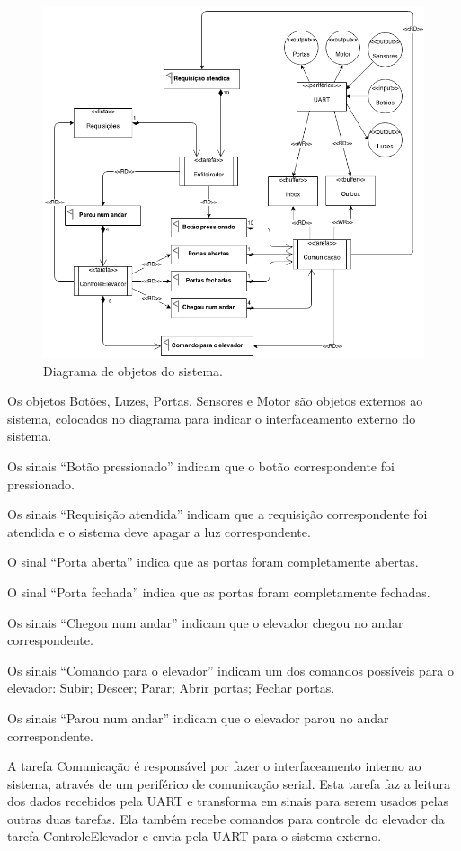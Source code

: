 \begin{figure}[h]
    \centering
    \includegraphics[width=0.8\columnwidth]{./figures/Objetos.png}
    \caption{Diagrama de objetos do sistema.}
    \label{fig:objetos}
\end{figure}

Os objetos Botões, Luzes, Portas, Sensores e Motor são objetos externos ao sistema, colocados no diagrama para indicar o interfaceamento externo do sistema.

Os sinais ``Botão pressionado'' indicam que o botão correspondente foi pressionado.

Os sinais ``Requisição atendida'' indicam que a requisição correspondente foi atendida e o sistema deve apagar a luz correspondente.

O sinal ``Porta aberta'' indica que as portas foram completamente abertas.

O sinal ``Porta fechada'' indica que as portas foram completamente fechadas.

Os sinais ``Chegou num andar'' indicam que o elevador chegou no andar correspondente.

Os sinais ``Comando para o elevador'' indicam um dos comandos possíveis para o elevador: Subir; Descer; Parar; Abrir portas; Fechar portas.

Os sinais ``Parou num andar'' indicam que o elevador parou no andar correspondente.

A tarefa Comunicação é responsável por fazer o interfaceamento interno ao sistema, através de um periférico de comunicação serial. Esta tarefa faz a leitura dos dados recebidos pela UART e transforma em sinais para serem usados pelas outras duas tarefas. Ela também recebe comandos para controle do elevador da tarefa ControleElevador e envia pela UART para o sistema externo.

